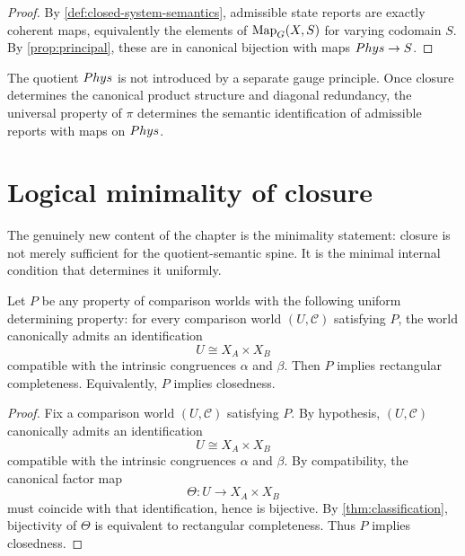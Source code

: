 \begin{proof}
	By \cref{def:closed-system-semantics}, admissible state reports are
	exactly coherent maps, equivalently the elements of \(\operatorname{Map}_G(X,S)\) for
	varying codomain \(S\). By \cref{prop:principal}, these are in canonical
	bijection with maps \(Phys\to S\).
\end{proof}
\begin{remark}
	The quotient \(Phys\) is not introduced by a separate gauge principle.
	Once closure determines the canonical product structure and diagonal
	redundancy, the universal property of \(\pi\) determines the semantic
	identification of admissible reports with maps on \(Phys\).
\end{remark}
\section{Logical minimality of closure}
\label{sec:closure-minimality}
The genuinely new content of the chapter is the minimality statement:
closure is not merely sufficient for the quotient-semantic spine. It is
the minimal internal condition that determines it uniformly.
\begin{theorem}
	\label{thm:logical-minimality}
	Let \(P\) be any property of comparison worlds with the following
	uniform determining property:
	\medskip
	\noindent
	for every comparison world \((U,\mathcal C)\) satisfying \(P\), the
	world canonically admits an identification
	\[
		U\cong X_A\times X_B
	\]
	compatible with the intrinsic congruences \(\alpha\) and \(\beta\).
	\medskip
	\noindent
	Then \(P\) implies rectangular completeness. Equivalently, \(P\) implies
	closedness.
\end{theorem}
\begin{proof}
	Fix a comparison world \((U,\mathcal C)\) satisfying \(P\). By
	hypothesis, \((U,\mathcal C)\) canonically admits an identification
	\[
		U\cong X_A\times X_B
	\]
	compatible with the intrinsic congruences \(\alpha\) and \(\beta\). By
	compatibility, the canonical factor map
	\[
		\Theta:U\to X_A\times X_B
	\]
	must coincide with that identification, hence is bijective. By
	\cref{thm:classification}, bijectivity of \(\Theta\) is equivalent to
	rectangular completeness. Thus \(P\) implies closedness.
\end{proof}
